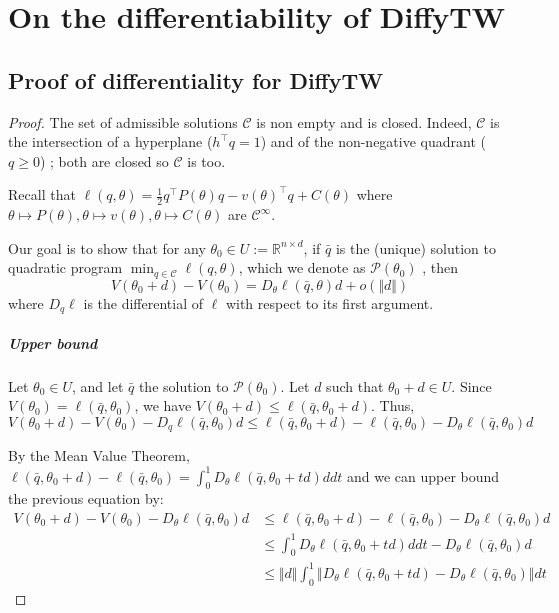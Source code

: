 \section{On the differentiability of DiffyTW}


\subsection{Proof of differentiality for DiffyTW}\label{sec:proof-diffytw-grad}
\begin{proof}

The set of admissible solutions $\mathcal C$ is non empty and is closed. Indeed, $\mathcal C$ is the intersection of a hyperplane ($h^\top q=1$) and of the non-negative quadrant ($q \geq 0$) ; both are closed so $\mathcal C$ is too.

Recall that $\ell(q, \theta) = \frac{1}{2}q^\top P(\theta) q - v(\theta)^\top q + C(\theta)$ where $\theta \mapsto P(\theta), \theta \mapsto v(\theta), \theta \mapsto C(\theta)$ are $\mathcal C^\infty$.

Our goal is to show that for any $\theta_0\in U :=\mathbb R^{n \times d}$, if $\bar q$ is the (unique) solution to quadratic program $\min_{q\in\mathcal C}\ell(q, \theta)$, which we denote as $\mathcal P(\theta_0)$ , then
   \begin{equation}\label{eq:goal}
       V(\theta_0 + d) - V(\theta_0) = D_\theta \ell(\bar q, \theta)d + o\left(\Vert d\Vert\right)
   \end{equation}
   where $D_q \ell$ is the differential of $\ell$ with respect to its first argument.

   \subparagraph{Upper bound}
   Let $\theta_0 \in U$, and let $\bar q$ the solution to $\mathcal P(\theta_0)$. Let $d$ such that $\theta_0 + d \in U$. Since $V(\theta_0) = \ell(\bar q, \theta_0)$, we have $V(\theta_0+d) \leq \ell(\bar q, \theta_0 + d)$. Thus,
   \begin{equation}
       V(\theta_0 + d) - V(\theta_0) - D_q\ell(\bar q, \theta_0)d \leq \ell(\bar q, \theta_0 + d) - \ell(\bar q, \theta_0) - D_\theta \ell(\bar q, \theta_0)d
   \end{equation}

By the Mean Value Theorem, $\ell(\bar q, \theta_0 + d) - \ell(\bar q, \theta_0) = \int_0^1 D_\theta\ell(\bar q, \theta_0 + td)ddt$ and we can upper bound the previous equation by:
   \begin{align}
       V(\theta_0 + d) - V(\theta_0) - D_\theta\ell(\bar q, \theta_0)d&\leq \ell(\bar q, \theta_0 + d) - \ell(\bar q, \theta_0) - D_\theta \ell(\bar q, \theta_0)d\\
       &\leq \int_0^1 D_\theta\ell(\bar q, \theta_0 + td)ddt  - D_\theta \ell(\bar q, \theta_0)d\\
        &\leq \Vert d\Vert \int_0^1 \Vert D_\theta\ell(\bar q, \theta_0 +td) - D_\theta\ell(\bar q, \theta_0)\Vert dt
   \end{align}


\end{proof}
